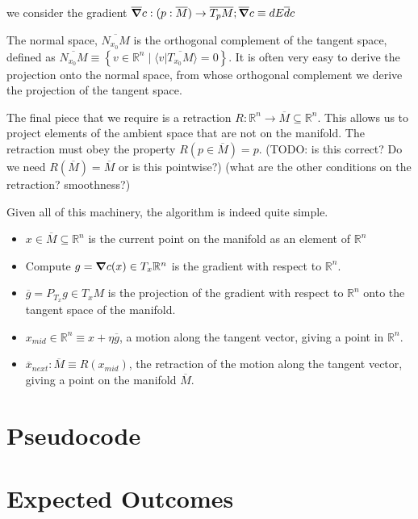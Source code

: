 \documentclass[11pt]{book}
\begin{document}
we consider the gradient
$\overline \grad c : (p: \overline M) \rightarrow \overline{T_p M}; \overline \grad c \equiv dE \overline dc$

The normal space,
$\overline{N_{x_0} M}$ is the orthogonal complement of the tangent space, defined
as $\overline{N_{x_0} M} \equiv \left\{ v \in \mathbb R^n \mid \langle v | \overline{T_{x_0} M} \rangle = 0 \right\}$.
It is often very easy to derive the projection onto the normal space, from
whose orthogonal complement we derive the projection of the tangent space.

The final piece that we require is a retraction $R: \mathbb R^n \rightarrow \overline M \subseteq \mathbb R^n$. This allows
us to project elements of the ambient space that are not on the manifold. The
retraction must obey the property $R(p \in \overline M) = p$.
(TODO: is this correct? Do we need $R(\overline M) = \overline M$ or is this pointwise?)
(what are the other conditions on the retraction? smoothness?)

Given all of this machinery, the algorithm is indeed quite simple. 

\begin{itemize}
	\item $x \in \overline M \subseteq \mathbb R^n$ is the current point on the manifold as an element of $\mathbb R^n$
	\item Compute $g = \grad c(x) \in T_x \mathbb R^n$ is the gradient with respect to $\mathbb R^n$.
	\item $\overline g = P_{T_x} g \in T_x M$ is the projection of the gradient with respect to $\mathbb R^n$ onto the 
	tangent space of the manifold.
	\item $x_{mid}\in \mathbb R^n \equiv x + \eta \overline g$, a motion along the tangent vector, giving a point in
	$\mathbb R^n$.
	\item $\overline x_{next}: \overline M \equiv R(x_{mid})$, the retraction of the motion along the tangent vector,
	giving a point on the manifold $\overline M$.
\end{itemize}

\section{Pseudocode}

\section{Expected Outcomes}
\end{document}

